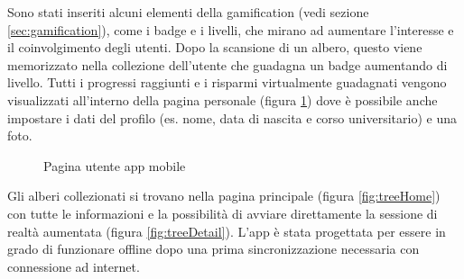 Sono stati inseriti alcuni elementi della gamification (vedi sezione \ref{sec:gamification}), come i badge e i livelli, che mirano ad aumentare l'interesse e il coinvolgimento degli utenti.
Dopo la scansione di un albero, questo viene memorizzato nella collezione dell'utente che guadagna un badge aumentando di livello.
Tutti i progressi raggiunti e i risparmi virtualmente guadagnati vengono visualizzati all'interno della pagina personale (figura \ref{fig:userPage}) dove è possibile anche impostare i dati del profilo (es. nome, data di nascita e corso universitario) e una foto.

\begin{figure}
    \centering
    \caption{Pagina utente app mobile}
    \label{fig:userPage}
\end{figure}

Gli alberi collezionati si trovano nella pagina principale (figura \ref{fig:treeHome}) con tutte le informazioni e la possibilità di avviare direttamente la sessione di realtà aumentata (figura \ref{fig:treeDetail}).
L'app è stata progettata per essere in grado di funzionare offline dopo una prima sincronizzazione necessaria con connessione ad internet.

